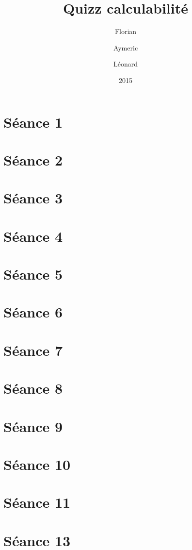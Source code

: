 \documentclass[a4paper, 12pt]{article}
\author{Florian \bsc{Thuin} \and Aymeric \bsc{De Cocq} \and Léonard \bsc{Julémont}}
\title{Quizz calculabilité}
\date{2015}
\begin{document}
\maketitle

\tableofcontents

\section{Séance 1}



\section{Séance 2}



\section{Séance 3}



\section{Séance 4}



\section{Séance 5}



\section{Séance 6}



\section{Séance 7}



\section{Séance 8}



\section{Séance 9}



\section{Séance 10}



\section{Séance 11}



\section{Séance 13}


\end{document}
